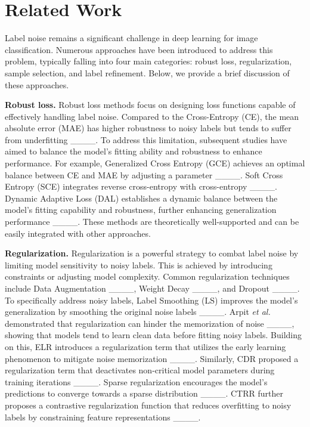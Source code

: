 \section{Related Work}
\label{sec2}
Label noise remains a significant challenge in deep learning for image classification. Numerous approaches have been introduced to address this problem, typically falling into four main categories: robust loss, regularization, sample selection, and label refinement. Below, we provide a brief discussion of these approaches.

\textbf{Robust loss.} Robust loss methods focus on designing loss functions capable of effectively handling label noise. Compared to the Cross-Entropy (CE), the mean absolute error (MAE) has higher robustness to noisy labels but tends to suffer from underfitting ____. To address this limitation, subsequent studies have aimed to balance the model’s fitting ability and robustness to enhance performance. For example, Generalized Cross Entropy (GCE) achieves an optimal balance between CE and MAE by adjusting a parameter ____. Soft Cross Entropy (SCE) integrates reverse cross-entropy with cross-entropy ____. Dynamic Adaptive Loss (DAL) establishes a dynamic balance between the model’s fitting capability and robustness, further enhancing generalization performance ____. These methods are theoretically well-supported and can be easily integrated with other approaches.

\textbf{Regularization.} Regularization is a powerful strategy to combat label noise by limiting model sensitivity to noisy labels. This is achieved by introducing constraints or adjusting model complexity. Common regularization techniques include Data Augmentation ____, Weight Decay ____, and Dropout ____. To specifically address noisy labels, Label Smoothing (LS) improves the model’s generalization by smoothing the original noise labels ____. Arpit \textit{et al.} demonstrated that regularization can hinder the memorization of noise ____, showing that models tend to learn clean data before fitting noisy labels. Building on this, ELR introduces a regularization term that utilizes the early learning phenomenon to mitigate noise memorization ____. Similarly, CDR proposed a regularization term that deactivates non-critical model parameters during training iterations ____. Sparse regularization encourages the model’s predictions to converge towards a sparse distribution ____. CTRR further proposes a contrastive regularization function that reduces overfitting to noisy labels by constraining feature representations ____.

